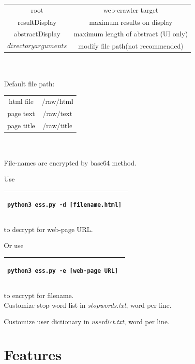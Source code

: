 \documentclass{article}
\begin{document}
\begin{tabular}{c|c}
root              & web-crawler target \\
resultDisplay     & maximum results on display \\
abstractDisplay   & maximum length of abstract (UI only) \\
\[directory arguments\] & modify file path(not recommended)
\end{tabular}\\
\\

Default file path:\\

\begin{tabular}{c|c}
html file           & /raw/html \\
page text           & /raw/text \\
page title          & /raw/title
\end{tabular}\\

\ \\

File-names are encrypted by base64 method. 

Use \begin{tabular}{|l|}\hline\begin{minipage}[t][1em]{17em}\begin{verbatim}python3 ess.py -d [filename.html] \end{verbatim}\end{minipage}\\\hline\end{tabular} to decrypt for web-page URL. 

Or use \begin{tabular}{|l|}\hline\begin{minipage}[t][1em]{16.5em}\begin{verbatim}python3 ess.py -e [web-page URL] \end{verbatim}\end{minipage}\\\hline\end{tabular} to encrypt for filename.\\

Customize stop word list in \emph{stopwords.txt}, word per line.

Customize user dictionary in \emph{userdict.txt}, word per line.
\newpage

\section{Features}
\end{document}
